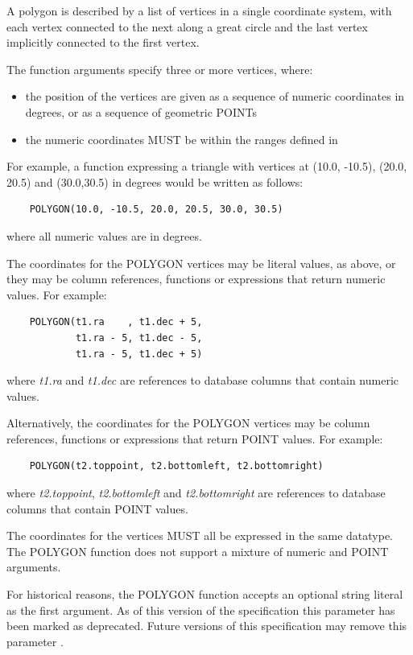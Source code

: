 \documentclass[11pt,a4paper]{ivoa}
\begin{document}
A polygon is described by a list of vertices in a single coordinate system, with
each vertex connected to the next along a great circle and the last vertex
implicitly connected to the first vertex.

The function arguments specify three or more vertices, where:
\begin{itemize}
    \item the position of the vertices are given as a sequence of
    numeric coordinates in degrees, or as a sequence of geometric POINTs
    \item the numeric coordinates MUST be within the ranges defined in
\end{itemize}

For example, a function expressing a triangle with vertices at (10.0,
-10.5), (20.0, 20.5) and (30.0,30.5) in degrees would be written
as follows:
\begin{verbatim}
    POLYGON(10.0, -10.5, 20.0, 20.5, 30.0, 30.5)
\end{verbatim}
\noindent
where all numeric values are in degrees.

The coordinates for the POLYGON vertices may be literal values, as above,
or they may be column references, functions or expressions that return
numeric values.
For example:
\begin{verbatim}
    POLYGON(t1.ra    , t1.dec + 5,
            t1.ra - 5, t1.dec - 5,
            t1.ra - 5, t1.dec + 5)
\end{verbatim}
\noindent
where \textit{t1.ra} and \textit{t1.dec} are references to database columns
that contain numeric values.

Alternatively, the coordinates for the POLYGON vertices may be column references,
functions or expressions that return POINT values.
For example:
\begin{verbatim}
    POLYGON(t2.toppoint, t2.bottomleft, t2.bottomright)
\end{verbatim}
\noindent
where \textit{t2.toppoint}, \textit{t2.bottomleft} and \textit{t2.bottomright}
are references to database columns that contain POINT values.

The coordinates for the vertices MUST all be expressed in the same datatype.
The POLYGON function does not support a mixture of numeric and POINT
arguments.

For historical reasons, the POLYGON function accepts an optional string literal
as the first argument.
As of this version of the specification this parameter has been
marked as deprecated.
Future versions of this specification may remove this parameter
.
\end{document}
